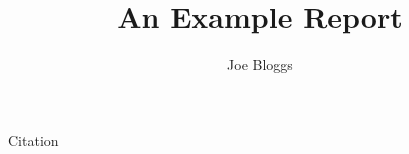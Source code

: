 \documentclass[gentium]{lincolncsreport}
\title{An Example Report}
\author{Joe Bloggs}
\begin{document}
\makeTitlePageAlt  %
\makeTOC           %

\blinddocument

Citation~\cite{beringer2012review}

\newpage


\end{document}
